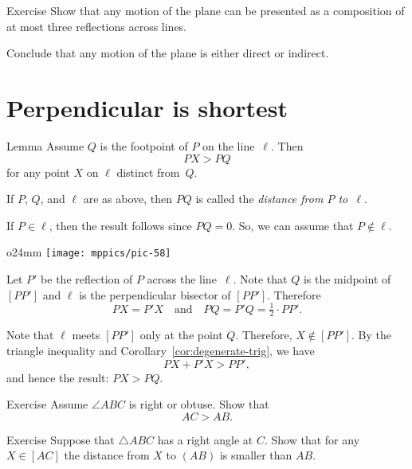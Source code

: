 \begin{thm}{Exercise}\label{ex:3-reflections}
Show that any motion of the plane can be presented as a 
composition of at most three reflections across lines.

Conclude that any motion of the plane is either direct or indirect.
\end{thm} 

\section{Perpendicular is shortest}
\label{sec:perp<oblique}

\begin{thm}[\abs]{Lemma}\label{lem:perp<oblique}
Assume $Q$ is the footpoint of $P$ on the line~$\ell$.
Then 
$$PX>PQ$$
for any point $X$ on $\ell$ distinct from~$Q$. 
\end{thm}

If $P$, $Q$, and $\ell$ are as above, 
then $PQ$ is called the \label{distance!from a point to a line}\emph{distance from $P$ to~$\ell$}. 

If $P\in \ell$, 
then the result follows since $PQ=0$.
So, we can assume that $P\notin \ell$.

\begin{wrapfigure}{o}{24mm}
\centering
\texttt{[image: mppics/pic-58]}
\vskip3mm
\end{wrapfigure}

Let $P'$ be the reflection of $P$ across the line~$\ell$.
Note that $Q$ is the midpoint of $[PP']$
and $\ell$ is the perpendicular bisector of $[PP']$.
Therefore
$$PX=P'X
\quad
\text{and}
\quad
PQ=P'Q=\tfrac12\cdot PP'.$$

Note that $\ell$ meets $[PP']$ only at the point $Q$.
Therefore, $X\notin [PP']$.
By the triangle inequality and Corollary~\ref{cor:degenerate-trig}, we have 
$$PX+P'X>PP',$$
and hence the result: $PX>PQ$.
\qeds

\begin{thm}{Exercise}\label{ex:obtuce}
Assume $\angle ABC$ is right or obtuse.
Show that 
\[AC>AB.\]

\end{thm}

\begin{thm}{Exercise}\label{ex:right-triangle-inq}
Suppose that $\triangle ABC$ has a right angle at $C$.
Show that for any $X\in [AC]$ the distance from $X$ to $(AB)$ is smaller than $AB$.
\end{thm}

